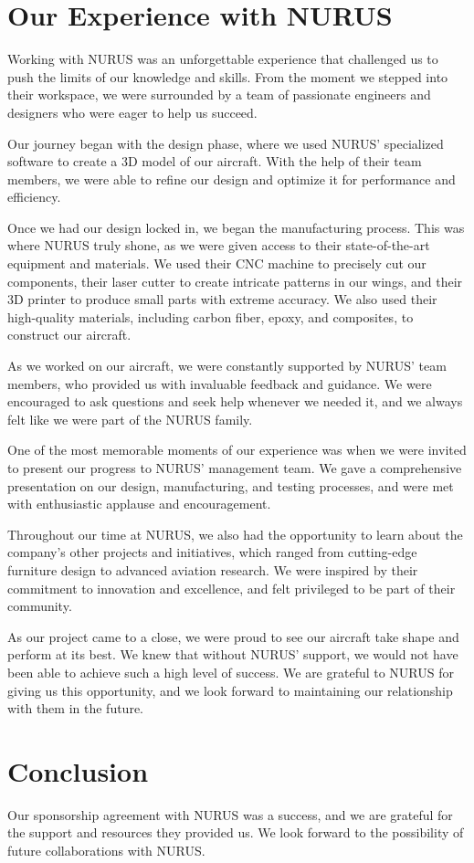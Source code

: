\documentclass{article}
\begin{document}
\section{Our Experience with NURUS}

Working with NURUS was an unforgettable experience that challenged us to push the limits of our knowledge and skills. From the moment we stepped into their workspace, we were surrounded by a team of passionate engineers and designers who were eager to help us succeed.

Our journey began with the design phase, where we used NURUS' specialized software to create a 3D model of our aircraft. With the help of their team members, we were able to refine our design and optimize it for performance and efficiency.

Once we had our design locked in, we began the manufacturing process. This was where NURUS truly shone, as we were given access to their state-of-the-art equipment and materials. We used their CNC machine to precisely cut our components, their laser cutter to create intricate patterns in our wings, and their 3D printer to produce small parts with extreme accuracy. We also used their high-quality materials, including carbon fiber, epoxy, and composites, to construct our aircraft.

As we worked on our aircraft, we were constantly supported by NURUS' team members, who provided us with invaluable feedback and guidance. We were encouraged to ask questions and seek help whenever we needed it, and we always felt like we were part of the NURUS family.

One of the most memorable moments of our experience was when we were invited to present our progress to NURUS' management team. We gave a comprehensive presentation on our design, manufacturing, and testing processes, and were met with enthusiastic applause and encouragement.

Throughout our time at NURUS, we also had the opportunity to learn about the company's other projects and initiatives, which ranged from cutting-edge furniture design to advanced aviation research. We were inspired by their commitment to innovation and excellence, and felt privileged to be part of their community.

As our project came to a close, we were proud to see our aircraft take shape and perform at its best. We knew that without NURUS' support, we would not have been able to achieve such a high level of success. We are grateful to NURUS for giving us this opportunity, and we look forward to maintaining our relationship with them in the future.


\section{Conclusion}

Our sponsorship agreement with NURUS was a success, and we are grateful for the support and resources they provided us. We look forward to the possibility of future collaborations with NURUS.
\end{document}
